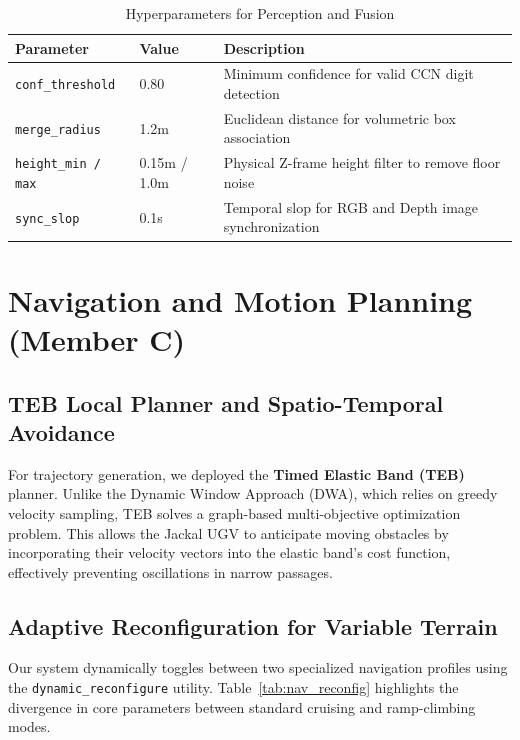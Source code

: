 \documentclass[11pt, a4paper]{article}
\begin{document}
\begin{table}[htbp]
\centering
\caption{Hyperparameters for Perception and Fusion}
\label{tab:perception_params}
\begin{tabular}{@{}lll@{}}
\toprule
\textbf{Parameter} & \textbf{Value} & \textbf{Description} \\ \midrule
\texttt{conf\_threshold} & 0.80 & Minimum confidence for valid CCN digit detection \\
\texttt{merge\_radius} & 1.2m & Euclidean distance for volumetric box association \\
\texttt{height\_min / max} & 0.15m / 1.0m & Physical Z-frame height filter to remove floor noise \\
\texttt{sync\_slop} & 0.1s & Temporal slop for RGB and Depth image synchronization \\
\bottomrule
\end{tabular}
\end{table}

\section{Navigation and Motion Planning (Member C)}
\subsection{TEB Local Planner and Spatio-Temporal Avoidance}
For trajectory generation, we deployed the \textbf{Timed Elastic Band (TEB)} planner. Unlike the Dynamic Window Approach (DWA), which relies on greedy velocity sampling, TEB solves a graph-based multi-objective optimization problem. This allows the Jackal UGV to anticipate moving obstacles by incorporating their velocity vectors into the elastic band's cost function, effectively preventing oscillations in narrow passages.

\subsection{Adaptive Reconfiguration for Variable Terrain}
Our system dynamically toggles between two specialized navigation profiles using the \texttt{dynamic\_reconfigure} utility. Table~\ref{tab:nav_reconfig} highlights the divergence in core parameters between standard cruising and ramp-climbing modes.
\end{document}

